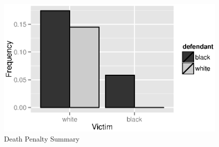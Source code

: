 \documentclass{exam}
\begin{document}
  \begin{figure}[H]
    \centering
    \includegraphics[scale = 0.9]{figures/death_penalty.eps}
    \caption{Death Penalty Summary}
  \end{figure}
\end{document}

